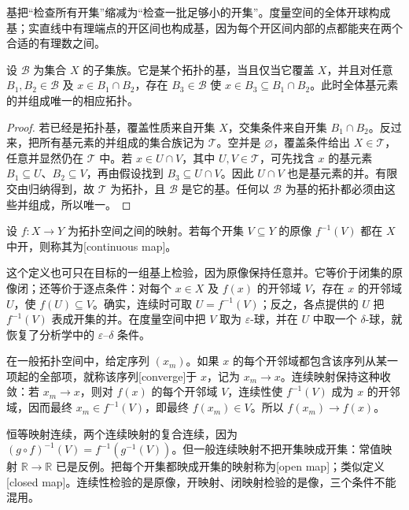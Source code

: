 基把“检查所有开集”缩减为“检查一批足够小的开集”。度量空间的全体开球构成基；实直线中有理端点的开区间也构成基，因为每个开区间内部的点都能夹在两个合适的有理数之间。

\begin{proposition}\label{g1:prop:basis-test}
	设 \(\mathcal B\) 为集合 \(X\) 的子集族。它是某个拓扑的基，当且仅当它覆盖 \(X\)，并且对任意 \(B_1,B_2\in\mathcal B\) 及 \(x\in B_1\cap B_2\)，存在 \(B_3\in\mathcal B\) 使 \(x\in B_3\subseteq B_1\cap B_2\)。此时全体基元素的并组成唯一的相应拓扑。
\end{proposition}
\begin{proof}
	若已经是拓扑基，覆盖性质来自开集 \(X\)，交集条件来自开集 \(B_1\cap B_2\)。反过来，把所有基元素的并组成的集合族记为 \(\mathcal T\)。空并是 \(\varnothing\)，覆盖条件给出 \(X\in\mathcal T\)，任意并显然仍在 \(\mathcal T\) 中。若 \(x\in U\cap V\)，其中 \(U,V\in\mathcal T\)，可先找含 \(x\) 的基元素 \(B_1\subseteq U\)、\(B_2\subseteq V\)，再由假设找到 \(B_3\subseteq U\cap V\)。因此 \(U\cap V\) 也是基元素的并。有限交由归纳得到，故 \(\mathcal T\) 为拓扑，且 \(\mathcal B\) 是它的基。任何以 \(\mathcal B\) 为基的拓扑都必须由这些并组成，所以唯一。
\end{proof}

\begin{definition}\label{g1:def:continuous-map}
	设 \(f:X\to Y\) 为拓扑空间之间的映射。若每个开集 \(V\subseteq Y\) 的原像 \(f^{-1}(V)\) 都在 \(X\) 中开，则称其为[continuous map]。
\end{definition}

这个定义也可只在目标的一组基上检验，因为原像保持任意并。它等价于闭集的原像闭；还等价于逐点条件：对每个 \(x\in X\) 及 \(f(x)\) 的开邻域 \(V\)，存在 \(x\) 的开邻域 \(U\)，使 \(f(U)\subseteq V\)。确实，连续时可取 \(U=f^{-1}(V)\)；反之，各点提供的 \(U\) 把 \(f^{-1}(V)\) 表成开集的并。在度量空间中把 \(V\) 取为 \(\varepsilon\)-球，并在 \(U\) 中取一个 \(\delta\)-球，就恢复了分析学中的 \(\varepsilon\)--\(\delta\) 条件。

在一般拓扑空间中，给定序列 \((x_m)\)。如果 \(x\) 的每个开邻域都包含该序列从某一项起的全部项，就称该序列[converge]于 \(x\)，记为 \(x_m\to x\)。连续映射保持这种收敛：若 \(x_m\to x\)，则对 \(f(x)\) 的每个开邻域 \(V\)，连续性使 \(f^{-1}(V)\) 成为 \(x\) 的开邻域，因而最终 \(x_m\in f^{-1}(V)\)，即最终 \(f(x_m)\in V\)。所以 \(f(x_m)\to f(x)\)。

恒等映射连续，两个连续映射的复合连续，因为 \((g\circ f)^{-1}(V)=f^{-1}(g^{-1}(V))\)。但一般连续映射不把开集映成开集：常值映射 \(\mathbb R\to\mathbb R\) 已是反例。把每个开集都映成开集的映射称为[open map]；类似定义[closed map]。连续性检验的是原像，开映射、闭映射检验的是像，三个条件不能混用。

